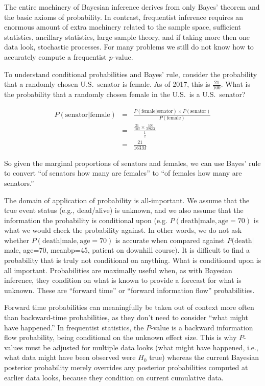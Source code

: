 The entire machinery of Bayesian inference derives from only Bayes'
theorem and the basic axioms of probability.  In contrast, frequentist
inference requires an enormous amount of extra machinery related to
the sample space, sufficient statistics, ancillary statistics, large
sample theory, and if taking more then one data look, stochastic
processes.  For many problems we still do not know how to 
accurately compute a frequentist $p$-value.

To understand conditional probabilities and Bayes' rule, consider the
probability that a randomly chosen U.S.\ senator is female.  As of
2017, this is $\frac{21}{100}$.  What is the probability that a
randomly chosen female in the U.S.\ is a U.S.\ senator?

\begin{eqnarray*}
P(\mathrm{senator}|\mathrm{female}) &=& \frac{P(\mathrm{female}|\mathrm{senator}) \times P(\mathrm{senator})}{P(\mathrm{female})} \\
 &=& \frac{\frac{21}{100} \times \frac{100}{326M}}{\frac{1}{2}} \\
 &=& \frac{21}{163M}
 \end{eqnarray*}

So given the marginal proportions of senators and females, we can use
Bayes' rule to convert ``of senators how many are females'' to ``of
females how many are senators.''

The domain of application of
probability is all-important.  We assume that the true event status
(e.g., dead/alive) is unknown, and we also assume that the information
the probability is conditional upon (e.g.  $P(\mathrm{death}|\mathrm{male,
age=70})$ is what we would check the probability against.  In other
words, we do not ask whether $P(\mathrm{death} | \mathrm{male,
  age=70})$ is accurate 
when compared against $P(\mathrm{death} |$ male, age=70, meanbp=45, patient
on downhill course$)$.  It is difficult to find a probability that is
truly not conditional on anything.  What is conditioned upon is all
important.  Probabilities are maximally useful when, as with Bayesian
inference, they condition on what is known to provide a forecast for
what is unknown.  These are ``forward time'' or ``forward information
flow'' probabilities.

Forward time probabilities can meaningfully be
taken out of context more often than backward-time probabilities, as
they don't need to consider ``what might have happened.''  In
frequentist statistics, the $P$-value is a backward information flow
probability, being conditional on the unknown effect size.  This is
why $P$-values must be adjusted for multiple data looks (what might
have happened, i.e., what data might have been observed were $H_{0}$
true) whereas the current Bayesian posterior probability 
merely overrides any posterior probabilities computed at earlier data
looks, because they condition on current cumulative data.
